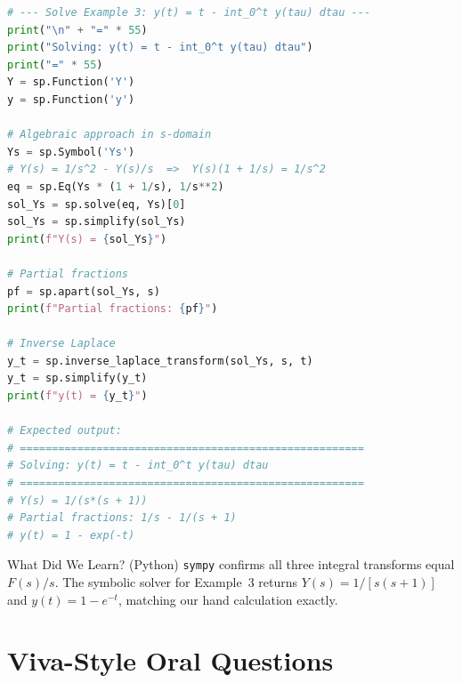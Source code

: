 \documentclass[12pt,a4paper]{article}
\begin{document}
\begin{lstlisting}[language=Python, caption={Laplace Transform of Integrals --- Symbolic Verification}]
# --- Solve Example 3: y(t) = t - int_0^t y(tau) dtau ---
print("\n" + "=" * 55)
print("Solving: y(t) = t - int_0^t y(tau) dtau")
print("=" * 55)
Y = sp.Function('Y')
y = sp.Function('y')

# Algebraic approach in s-domain
Ys = sp.Symbol('Ys')
# Y(s) = 1/s^2 - Y(s)/s  =>  Y(s)(1 + 1/s) = 1/s^2
eq = sp.Eq(Ys * (1 + 1/s), 1/s**2)
sol_Ys = sp.solve(eq, Ys)[0]
sol_Ys = sp.simplify(sol_Ys)
print(f"Y(s) = {sol_Ys}")

# Partial fractions
pf = sp.apart(sol_Ys, s)
print(f"Partial fractions: {pf}")

# Inverse Laplace
y_t = sp.inverse_laplace_transform(sol_Ys, s, t)
y_t = sp.simplify(y_t)
print(f"y(t) = {y_t}")

# Expected output:
# ======================================================
# Solving: y(t) = t - int_0^t y(tau) dtau
# ======================================================
# Y(s) = 1/(s*(s + 1))
# Partial fractions: 1/s - 1/(s + 1)
# y(t) = 1 - exp(-t)
\end{lstlisting}

\begin{learnbox}{What Did We Learn? (Python)}
\texttt{sympy} confirms all three integral transforms equal $F(s)/s$. The symbolic
solver for Example~3 returns $Y(s) = 1/[s(s+1)]$ and $y(t) = 1 - e^{-t}$, matching
our hand calculation exactly.
\end{learnbox}

\section{Viva-Style Oral Questions}
\end{document}
